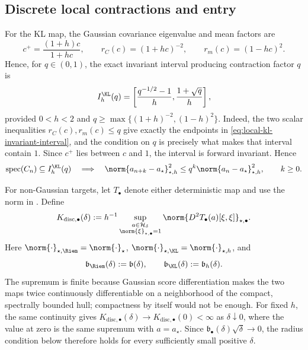 \subsection{Discrete local contractions and entry}
\label{sec:local-discrete}

For the KL map, the Gaussian covariance eigenvalue and mean factors are
\[
  c^+=\frac{(1+h)c}{1+hc},
  \qquad
  r_C(c)=(1+hc)^{-2},
  \qquad
  r_m(c)=(1-hc)^2.
\]
Hence, for \(q\in(0,1)\), the exact invariant interval producing contraction
factor \(q\) is
\begin{equation}
  I_h^{\KL}(q)
  =
  \left[
    \frac{q^{-1/2}-1}{h},
    \frac{1+\sqrt q}{h}
  \right],
  \label{eq:local-kl-invariant-interval}
\end{equation}
provided \(0<h<2\) and
\(q\geq\max\{(1+h)^{-2},(1-h)^2\}\).
Indeed, the two scalar inequalities \(r_C(c),r_m(c)\leq q\) give exactly
the endpoints in \eqref{eq:local-kl-invariant-interval}, and the condition on
\(q\) is precisely what makes that interval contain \(1\).  Since \(c^+\)
lies between \(c\) and \(1\), the interval is forward invariant.  Hence
\[
  \operatorname{spec}(C_n)\subseteq I_h^{\KL}(q)
  \quad\Longrightarrow\quad
  \norm{a_{n+k}-a_\star}_{\star,h}^2
  \leq q^k\norm{a_n-a_\star}_{\star,h}^2,\qquad k\geq0.
\]

For non-Gaussian targets, let \(T_\bullet\) denote either deterministic map
and use the norm in .  Define
\begin{equation}
  K_{\mathrm{disc},\bullet}(\delta)
  :=
  h^{-1}
  \sup_{\substack{a\in\mathcal H_\delta\\
                   \norm{\xi}_{\star,\bullet}=1}}
  \norm{D^2T_\bullet(a)[\xi,\xi]}_{\star,\bullet}.
  \label{eq:local-discrete-modulus}
\end{equation}
Here
\(\norm{\cdot}_{\star,\Riem}=\norm{\cdot}_\star\),
\(\norm{\cdot}_{\star,\KL}=\norm{\cdot}_{\star,h}\), and
\begin{equation}
  \mathfrak b_{\Riem}(\delta):=\mathfrak b(\delta),
  \qquad
  \mathfrak b_{\KL}(\delta):=\mathfrak b_h(\delta).
  \label{eq:local-discrete-b-factors}
\end{equation}
The supremum is finite because Gaussian score differentiation makes the two
maps twice continuously differentiable on a neighborhood of the compact,
spectrally bounded hull; compactness by itself would not be enough.  For
fixed \(h\), the same continuity gives
\(K_{\mathrm{disc},\bullet}(\delta)
\to K_{\mathrm{disc},\bullet}(0)<\infty\) as
\(\delta\downarrow0\), where the value at zero is the same supremum with
\(a=a_\star\).  Since
\(\mathfrak b_\bullet(\delta)\sqrt\delta\to0\), the radius condition below
therefore holds for every sufficiently small positive \(\delta\).

